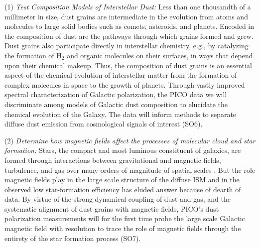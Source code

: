 \documentclass[PICOReport.tex]{subfiles}
\begin{document}
(1) {\em Test Composition Models of Interstellar Dust:} 
Less than one thousandth of a millimeter in size, dust grains are intermediate in the evolution from atoms and molecules to large solid bodies such as comets, asteroids, and planets. Encoded in the composition of dust are the pathways through which grains formed and grew. Dust grains also participate directly in interstellar chemistry, e.g., by catalyzing the formation of H$_2$ and organic molecules on their surfaces, in ways that depend upon their chemical makeup. Thus, the composition of dust grains is an essential aspect of the chemical evolution of interstellar matter from the formation of complex molecules in space to the growth of planets. Through vastly improved spectral characterization of Galactic polarization, the PICO data we will discriminate among models of Galactic dust composition to elucidate the chemical evolution of the Galaxy. The data will inform methods to separate diffuse dust emission from cosmological signals of interest (SO6). %
%

(2) {\em Determine how magnetic fields affect the processes of molecular cloud and star formation:}
Stars, the compact and most luminous constituent of galaxies, are formed through interactions between gravitational and magnetic fields, turbulence, and gas over many orders of magnitude of spatial scales . But the role magnetic fields play in the large scale structure of the diffuse \ac{ISM} and in the observed low star-formation efficiency has eluded answer because of dearth of data. 
By virtue of the strong dynamical coupling of dust and gas, and the systematic alignment of dust grains with magnetic fields, PICO's dust polarization measurements will for the first time probe the large scale Galactic magnetic field with resolution to trace the role of magnetic fields through the entirety of the star formation process (SO7). 

\end{document}
